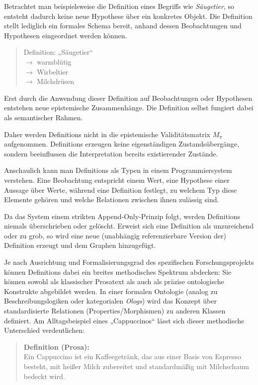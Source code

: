 \documentclass[11pt, a4paper]{article}
\begin{document}
	Betrachtet man beispielsweise die Definition eines Begriffs wie \emph{Säugetier}, so entsteht dadurch keine neue Hypothese über ein konkretes Objekt. Die Definition stellt lediglich ein formales Schema bereit, anhand dessen Beobachtungen und Hypothesen eingeordnet werden können.
	
	\begin{quote}
		Definition: „Säugetier“ \\
		\quad $\rightarrow$ warmblütig \\
		\quad $\rightarrow$ Wirbeltier \\
		\quad $\rightarrow$ Milchdrüsen
	\end{quote}
	
	Erst durch die Anwendung dieser Definition auf Beobachtungen oder Hypothesen entstehen neue epistemische Zusammenhänge. Die Definition selbst fungiert dabei als semantischer Rahmen.
	
	Daher werden Definitions nicht in die epistemische Validitätsmatrix $M_\pi$ aufgenommen. Definitions erzeugen keine eigenständigen Zustandsübergänge, sondern beeinflussen die Interpretation bereits existierender Zustände.
	
	Anschaulich kann man Definitions als Typen in einem Programmiersystem verstehen. Eine Beobachtung entspricht einem Wert, eine Hypothese einer Aussage über Werte, während eine Definition festlegt, zu welchem Typ diese Elemente gehören und welche Relationen zwischen ihnen zulässig sind.
	
	Da das System einem strikten Append-Only-Prinzip folgt, werden Definitions niemals überschrieben oder gelöscht. Erweist sich eine Definition als unzureichend oder zu grob, so wird eine neue (unabhängig referenzierbare Version der) Definition erzeugt und dem Graphen hinzugefügt.
	
	Je nach Ausrichtung und Formalisierungsgrad des spezifischen Forschungsprojekts können Definitions dabei ein breites methodisches Spektrum abdecken: Sie können sowohl als klassischer Prosatext als auch als präzise ontologische Konstrukte abgebildet werden. In einer formalen Ontologie (analog zu Beschreibungslogiken oder kategorialen \emph{Ologs}) wird das Konzept über standardisierte Relationen (Properties/Morphismen) zu anderen Klassen definiert. Am Alltagsbeispiel eines „Cappuccinos“ lässt sich dieser methodische Unterschied verdeutlichen:
	
	\begin{quote}
		\textbf{Definition (Prosa):} \\
		Ein Cappuccino ist ein Kaffeegetränk, das aus einer Basis von Espresso besteht, mit heißer Milch zubereitet und standardmäßig mit Milchschaum bedeckt wird.
	\end{quote}
	
\end{document}
